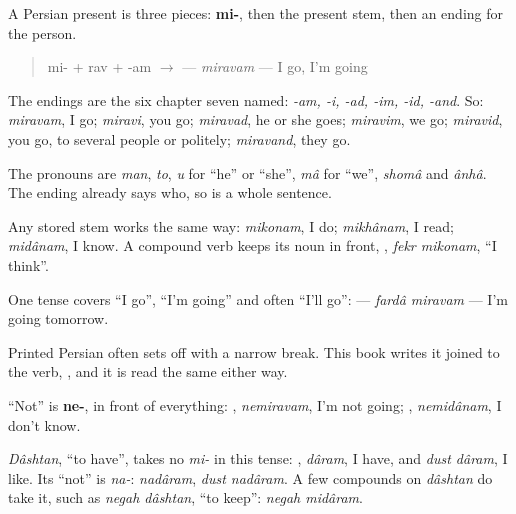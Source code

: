 \begin{grammarlens}[title={Grammar Lens: three pieces, in one order}]
A Persian present is three pieces: \textbf{mi-}, then the present stem, then an ending for the person.

\begin{quote}
mi- + rav + -am $\to$ \textbf{} — \emph{miravam} — I go, I'm going
\end{quote}

The endings are the six chapter seven named: \emph{-am, -i, -ad, -im, -id, -and}. So: \emph{miravam}, I go; \emph{miravi}, you go; \emph{miravad}, he or she goes; \emph{miravim}, we go; \emph{miravid}, you go, to several people or politely; \emph{miravand}, they go.

The pronouns are \emph{man}, \emph{to}, \emph{u} for \textquotedblleft{}he\textquotedblright{} or \textquotedblleft{}she\textquotedblright{}, \emph{mâ} for \textquotedblleft{}we\textquotedblright{}, \emph{shomâ} and \emph{ânhâ}. The ending already says who, so \textbf{} is a whole sentence.

Any stored stem works the same way: \emph{mikonam}, I do; \emph{mikhânam}, I read; \emph{midânam}, I know. A compound verb keeps its noun in front, \textbf{ }, \emph{fekr mikonam}, \textquotedblleft{}I think\textquotedblright{}.

One tense covers \textquotedblleft{}I go\textquotedblright{}, \textquotedblleft{}I'm going\textquotedblright{} and often \textquotedblleft{}I'll go\textquotedblright{}: \textbf{ } — \emph{fardâ miravam} — I'm going tomorrow.

Printed Persian often sets \textbf{} off with a narrow break. This book writes it joined to the verb, \textbf{}, and it is read the same either way.
\end{grammarlens}

\begin{grammarlens}[title={Grammar Lens: ne-, and the verb that refuses mi-}]
\textquotedblleft{}Not\textquotedblright{} is \textbf{ne-}, in front of everything: \textbf{}, \emph{nemiravam}, I'm not going; \textbf{}, \emph{nemidânam}, I don't know.

\emph{Dâshtan}, \textquotedblleft{}to have\textquotedblright{}, takes no \emph{mi-} in this tense: \textbf{}, \emph{dâram}, I have, and \emph{dust dâram}, I like. Its \textquotedblleft{}not\textquotedblright{} is \emph{na-}: \emph{nadâram}, \emph{dust nadâram}. A few compounds on \emph{dâshtan} do take it, such as \emph{negah dâshtan}, \textquotedblleft{}to keep\textquotedblright{}: \emph{negah midâram}.
\end{grammarlens}

